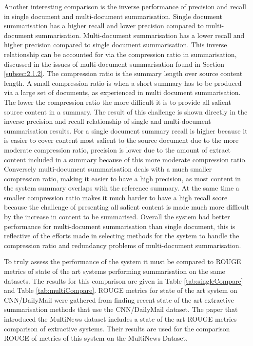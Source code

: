 Another interesting comparison is the inverse performance of precision and recall in single document and multi-document summarisation. Single document summarisation has a higher recall and lower precision compared to multi-document summarisation. Multi-document summarisation has a lower recall and higher precision compared to single document summarisation. This inverse relationship can be accounted for via the compression ratio in summarisation, discussed in the issues of multi-document summarisation found in Section \ref{subsec:2.1.2}. The compression ratio is the summary length over source content length. A small compression ratio is when a short summary has to be produced via a large set of documents, as experienced in multi document summarisation. The lower the compression ratio the more difficult it is to provide all salient source content in a summary. The result of this challenge is shown directly in the inverse precision and recall relationship of single and multi-document summarisation results. For a single document summary recall is higher because it is easier to cover content most salient to the source document due to the more moderate compression ratio, precision is lower due to the amount of extract content included in a summary because of this more moderate compression ratio. Conversely multi-document summarisation deals with a much smaller compression ratio, making it easier to have a high precision, as most content in the system summary overlaps with the reference summary. At the same time a smaller compression ratio makes it much harder to have a high recall score because the challenge of presenting all salient content is made much more difficult by the increase in content to be summarised. Overall the system had better performance for multi-document summarisation than single document, this is reflective of the efforts made in selecting methods for the system to handle the compression ratio and redundancy problems of multi-document summarisation.

To truly assess the performance of the system it must be compared to ROUGE metrics of state of the art systems performing summarisation on the same datasets. The results for this comparison are given in Table \ref{tab:singleCompare} and Table \ref{tab:multiCompare}. ROUGE metrics for state of the art system on CNN/DailyMail were gathered from finding recent state of the art extractive summarisation methods that use the CNN/DailyMail dataset. The paper that introduced the MultiNews dataset includes a state of the art ROUGE metrics comparison of extractive systems. Their results are used for the comparison ROUGE of metrics of this system on the MultiNews Dataset.


